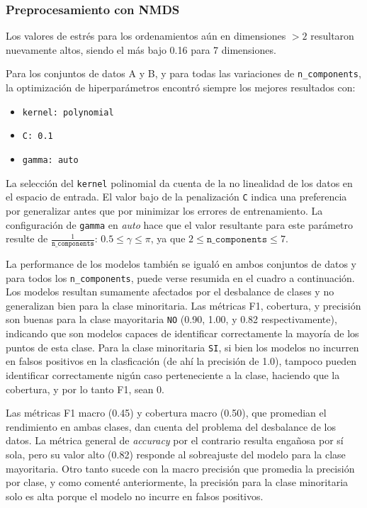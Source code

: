 \documentclass[10 pt]{article}
\begin{document}
\subsubsection{Preprocesamiento con NMDS}

Los valores de estrés para los ordenamientos aún en dimensiones \(>2\) resultaron nuevamente altos, siendo el más bajo 0.16 para 7 dimensiones.

Para los conjuntos de datos A y B, y para todas las variaciones de \texttt{n\_components}, la optimización de hiperparámetros encontró siempre los mejores resultados con:

\begin{itemize}
    \item \texttt{kernel: polynomial}
    \item \texttt{C: 0.1}
    \item \texttt{gamma: auto}
\end{itemize}

La selección del \texttt{kernel} polinomial da cuenta de la no linealidad de los datos en el espacio de entrada. El valor bajo de la penalización \texttt{C} indica una preferencia por generalizar antes que por minimizar los errores de entrenamiento. La configuración de \texttt{gamma} en \textit{auto} hace que el valor resultante para este parámetro resulte de \(\frac{1}{\texttt{n\_components}}\): \(0.5 \leq \gamma \leq \pi\), ya que \(2 \leq \texttt{n\_components} \leq 7\). 

La performance de los modelos también se igualó en ambos conjuntos de datos y para todos los \texttt{n\_components}, puede verse resumida en el cuadro  a continuación. Los modelos resultan sumamente afectados por el desbalance de clases y no generalizan bien para la clase minoritaria. Las métricas F1, cobertura, y precisión son buenas para la clase mayoritaria \texttt{NO} (0.90, 1.00, y 0.82 respectivamente), indicando que son modelos capaces de identificar correctamente la mayoría de los puntos de esta clase. Para la clase minoritaria \texttt{SI}, si bien los modelos no incurren en falsos positivos en la clasficación (de ahí la precisión de 1.0), tampoco pueden identificar correctamente nigún caso perteneciente a la clase, haciendo que la cobertura, y por lo tanto F1, sean 0.

Las métricas F1 macro (0.45) y cobertura macro (0.50), que promedian el rendimiento en ambas clases, dan cuenta del problema del desbalance de los datos. La métrica general de \textit{accuracy} por el contrario resulta engañosa por sí sola, pero su valor alto (0.82) responde al sobreajuste del modelo para la clase mayoritaria. Otro tanto sucede con la macro precisión que promedia la precisión por clase, y como comenté anteriormente, la precisión para la clase minoritaria solo es alta porque el modelo no incurre en falsos positivos.
\end{document}
